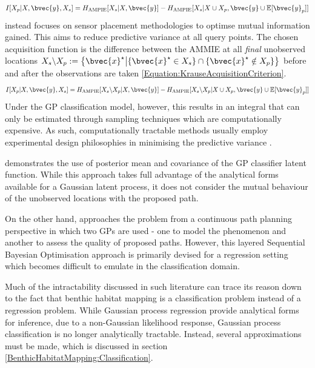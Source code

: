 \begin{equation}
				I[X_{p} | X, \bvec{y}, X_{s}] = H_{\mathrm{AMPIE}}[X_{s} | X, \bvec{y}] - H_{\mathrm{AMPIE}}[X_{s} | X \cup X_{p}, \bvec{y} \cup \mathbb{E}[\bvec{y}_{p}]]
			\label{Equation:AsherBenderAcquisitionCriterion}
			\end{equation} \cite{Krause:2008:NSP:1390681.1390689} instead focuses on sensor placement methodologies to optimse mutual information gained. This aims to reduce predictive variance at all query points. The chosen acquisition function is the difference between the AMMIE at all \textit{final} unobserved locations $X_{s} \backslash X_{p} := \big\{\bvec{x}^{\star} \big| \{\bvec{x}^{\star} \in X_{s}\} \cap \{\bvec{x}^{\star} \notin X_{p}\} \big\}$ before and after the observations are taken \eqref{Equation:KrauseAcquisitionCriterion}. \begin{equation}
				I[X_{p} | X, \bvec{y}, X_{s}] = H_{\mathrm{AMPIE}}[X_{s} \backslash X_{p} | X, \bvec{y}] - H_{\mathrm{AMPIE}}[X_{s} \backslash X_{p} | X \cup X_{p}, \bvec{y} \cup \mathbb{E}[\bvec{y}_{p}]]
			\label{Equation:KrauseAcquisitionCriterion}
			\end{equation} Under the GP classification model, however, this results in an integral that can only be estimated through sampling techniques which are computationally expensive. As such, computationally tractable methods usually employ experimental design philosophies in minimising the predictive variance \citep{AsherBender}.
			
			\cite{Kapoor} demonstrates the use of posterior mean and covariance of the GP classifier latent function. While this approach takes full advantage of the analytical forms available for a Gaussian latent process, it does not consider the mutual behaviour of the unobserved locations with the proposed path.
			
			On the other hand, \cite{Roman:SequentialBayesianOptimisation} approaches the problem from a continuous path planning perspective in which two GPs are used - one to model the phenomenon and another to assess the quality of proposed paths. However, this layered Sequential Bayesian Optimisation approach is primarily devised for a regression setting which becomes difficult to emulate in the classification domain.


			Much of the intractability discussed in such literature can trace its reason down to the fact that benthic habitat mapping is a classification problem instead of a regression problem. While Gaussian process regression provide analytical forms for inference, due to a non-Gaussian likelihood response, Gaussian process classification is no longer analytically tractable. Instead, several approximations must be made, which is discussed in section \ref{BenthicHabitatMapping:Classification}.
			
